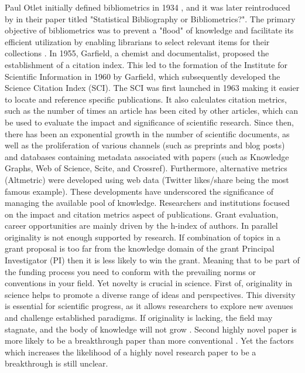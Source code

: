 Paul Otlet initially defined bibliometrics in 1934 \citep{otlet1990traite}, and it was later reintroduced by \cite{pritchard1969statistical} in their paper titled "Statistical Bibliography or Bibliometrics?". The primary objective of bibliometrics was to prevent a "flood" of knowledge and facilitate its efficient utilization by enabling librarians to select relevant items for their collections \citep{sugimoto2018measuring}. In 1955, Garfield, a chemist and documentalist, proposed the establishment of a citation index. This led to the formation of the Institute for Scientific Information in 1960 by Garfield, which subsequently developed the Science Citation Index (SCI). The SCI was first launched in 1963 making it easier to locate and reference specific publications. It also calculates citation metrics, such as the number of times an article has been cited by other articles, which can be used to evaluate the impact and significance of scientific research. Since then, there has been an exponential growth in the number of scientific documents, as well as the proliferation of various channels (such as preprints and blog posts) and databases containing metadata associated with papers (such as Knowledge Graphs, Web of Science, Scite, and Crossref). Furthermore, alternative metrics (Altmetric) were developed using web data (Twitter likes/share being the most famous example). These developments have underscored the significance of managing the available pool of knowledge. Researchers and institutions focused on the impact and citation metrics aspect of publications. Grant evaluation, career opportunities are mainly driven by the h-index of authors. In parallel originality is not enough supported by research. If combination of topics in a grant proposal is too far from the knowledge domain of the grant Principal Investigator (PI) then it is less likely to win the grant. Meaning that to be part of the funding process you need to conform with the prevailing norms or conventions in your field. Yet novelty is crucial in science. First of, originality in science helps to promote a diverse range of ideas and perspectives. This diversity is essential for scientific progress, as it allows researchers to explore new avenues and challenge established paradigms. If originality is lacking, the field may stagnate, and the body of knowledge will not grow \citep{flexner2017usefulness,arnott2020co}. Second highly novel paper is more likely to be a breakthrough paper than more conventional \citep{wang2017bias,shibayama2021measuring}. Yet the factors which increases the likelihood of a highly novel research paper to be a breakthrough is still unclear.

